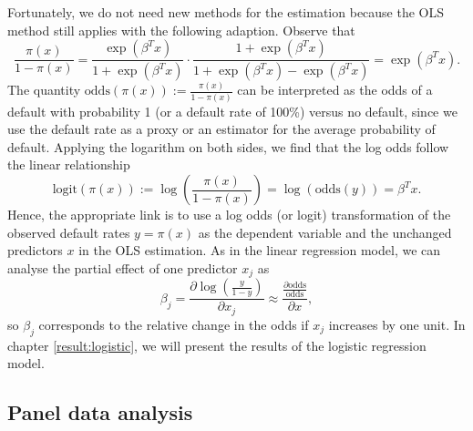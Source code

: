 \documentclass[a4paper, 12pt]{scrreprt}
\newcommand{\logit}{\mathrm{logit}}
\newcommand{\odds}{\mathrm{odds}}
\begin{document}
Fortunately, we do not need new methods for the estimation because the OLS method still applies with the following adaption.
Observe that
\begin{equation}
\frac{\pi(x)}{1-\pi(x)} = \frac{\exp(\beta^T x)}{1+\exp(\beta^T x)} \cdot \frac{1+ \exp(\beta^T x)}{1 + \exp(\beta^T x) - \exp(\beta^T x)}   = \exp(\beta^T x).
\end{equation}
The quantity $\odds(\pi(x)) := \frac{\pi(x)}{1-\pi(x)}$ can be interpreted as the odds of a default with probability 1 (or a default rate of 100\%) versus no default, since we use the default rate as a proxy or an estimator for the average probability of default.
Applying the logarithm on both sides, we find that the log odds follow the linear relationship 
\begin{equation}\label{logisticreg}
\logit(\pi(x)) := \log\left(\frac{\pi(x)}{1-\pi(x)}\right) = \log(\odds(y)) = \beta^T x.
\end{equation}
Hence, the appropriate link is to use a log odds (or logit) transformation of the observed default rates $y=\pi(x)$ as the dependent variable and the unchanged predictors $x$ in the OLS estimation.
As in the linear regression model, we can analyse the partial effect of one predictor $x_j$ as
\begin{equation} 
\beta_j = \frac{\partial \log\left(\frac{y}{1-y}\right)}{\partial x_j} \approx \frac{\frac{\partial \odds}{\odds}}{\partial x},
\end{equation}
so $\beta_j$ corresponds to the relative change in the odds if $x_j$ increases by one unit.
In chapter \ref{result:logistic}, we will present the results of the logistic regression model.

\subsection{Panel data analysis}\label{par:panel}
\end{document}
